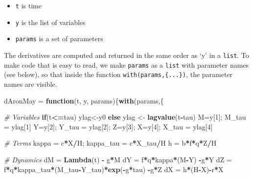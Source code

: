 \documentclass[
]{book}
\newenvironment{Shaded}{\begin{snugshade}}{\end{snugshade}}
\newcommand{\CommentTok}[1]{\textcolor[rgb]{0.56,0.35,0.01}{\textit{#1}}}
\newcommand{\ControlFlowTok}[1]{\textcolor[rgb]{0.13,0.29,0.53}{\textbf{#1}}}
\newcommand{\DecValTok}[1]{\textcolor[rgb]{0.00,0.00,0.81}{#1}}
\newcommand{\FunctionTok}[1]{\textcolor[rgb]{0.13,0.29,0.53}{\textbf{#1}}}
\newcommand{\NormalTok}[1]{#1}
\newcommand{\OtherTok}[1]{\textcolor[rgb]{0.56,0.35,0.01}{#1}}
\newcommand{\SpecialCharTok}[1]{\textcolor[rgb]{0.81,0.36,0.00}{\textbf{#1}}}
\begin{document}
\begin{itemize}
\item
  \texttt{t} is time
\item
  \texttt{y} is the list of variables
\item
  \texttt{params} is a set of parameters
\end{itemize}

The derivatives are computed and returned in the same order as `y' in a \texttt{list}. To make code that is easy to read, we make \texttt{params} as a \texttt{list} with parameter names (see below), so that inside the function \texttt{with(params,\{...\})}, the parameter names are visible.

\begin{Shaded}
\begin{Highlighting}[]
\NormalTok{dAronMay }\OtherTok{=} \ControlFlowTok{function}\NormalTok{(t, y, params)\{}\FunctionTok{with}\NormalTok{(params,\{}
 
  \CommentTok{\# Variables  }
  \ControlFlowTok{if}\NormalTok{(t}\SpecialCharTok{\textless{}=}\NormalTok{tau) ylag}\OtherTok{\textless{}{-}}\NormalTok{y0 }\ControlFlowTok{else}\NormalTok{ ylag }\OtherTok{\textless{}{-}} \FunctionTok{lagvalue}\NormalTok{(t}\SpecialCharTok{{-}}\NormalTok{tau)}
\NormalTok{  M}\OtherTok{=}\NormalTok{y[}\DecValTok{1}\NormalTok{]; M\_tau }\OtherTok{=}\NormalTok{ ylag[}\DecValTok{1}\NormalTok{]}
\NormalTok{  Y}\OtherTok{=}\NormalTok{y[}\DecValTok{2}\NormalTok{]; Y\_tau }\OtherTok{=}\NormalTok{ ylag[}\DecValTok{2}\NormalTok{]; }
\NormalTok{  Z}\OtherTok{=}\NormalTok{y[}\DecValTok{3}\NormalTok{]; }
\NormalTok{  X}\OtherTok{=}\NormalTok{y[}\DecValTok{4}\NormalTok{]; X\_tau }\OtherTok{=}\NormalTok{ ylag[}\DecValTok{4}\NormalTok{]}
   
  \CommentTok{\# Terms }
\NormalTok{  kappa }\OtherTok{=}\NormalTok{ c}\SpecialCharTok{*}\NormalTok{X}\SpecialCharTok{/}\NormalTok{H; kappa\_tau }\OtherTok{=}\NormalTok{ c}\SpecialCharTok{*}\NormalTok{X\_tau}\SpecialCharTok{/}\NormalTok{H}
\NormalTok{  h }\OtherTok{=}\NormalTok{ b}\SpecialCharTok{*}\NormalTok{f}\SpecialCharTok{*}\NormalTok{q}\SpecialCharTok{*}\NormalTok{Z}\SpecialCharTok{/}\NormalTok{H }
   
  \CommentTok{\# Dynamics }
\NormalTok{  dM }\OtherTok{=} \FunctionTok{Lambda}\NormalTok{(t) }\SpecialCharTok{{-}}\NormalTok{ g}\SpecialCharTok{*}\NormalTok{M}
\NormalTok{  dY }\OtherTok{=}\NormalTok{ f}\SpecialCharTok{*}\NormalTok{q}\SpecialCharTok{*}\NormalTok{kappa}\SpecialCharTok{*}\NormalTok{(M}\SpecialCharTok{{-}}\NormalTok{Y) }\SpecialCharTok{{-}}\NormalTok{g}\SpecialCharTok{*}\NormalTok{Y}
\NormalTok{  dZ }\OtherTok{=}\NormalTok{ f}\SpecialCharTok{*}\NormalTok{q}\SpecialCharTok{*}\NormalTok{kappa\_tau}\SpecialCharTok{*}\NormalTok{(M\_tau}\SpecialCharTok{{-}}\NormalTok{Y\_tau)}\SpecialCharTok{*}\FunctionTok{exp}\NormalTok{(}\SpecialCharTok{{-}}\NormalTok{g}\SpecialCharTok{*}\NormalTok{tau) }\SpecialCharTok{{-}}\NormalTok{g}\SpecialCharTok{*}\NormalTok{Z}
\NormalTok{  dX }\OtherTok{=}\NormalTok{ h}\SpecialCharTok{*}\NormalTok{(H}\SpecialCharTok{{-}}\NormalTok{X)}\SpecialCharTok{{-}}\NormalTok{r}\SpecialCharTok{*}\NormalTok{X}
  

\end{Highlighting}
\end{Shaded}
\end{document}
